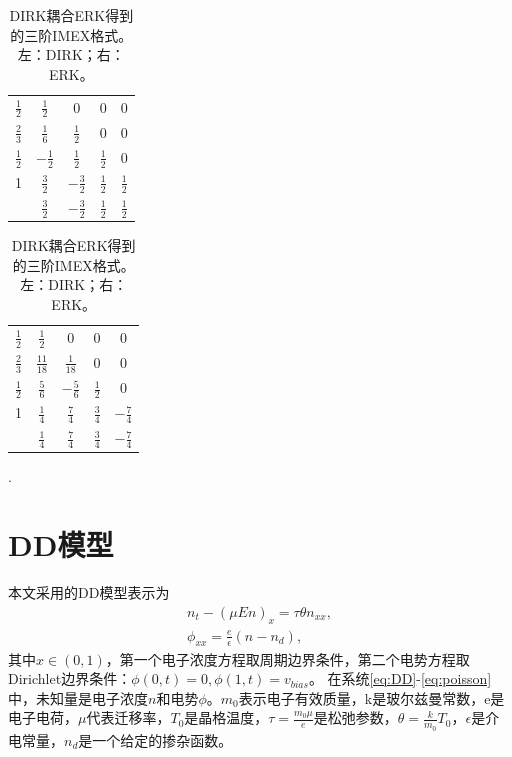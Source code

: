 \begin{table}
    \centering
    \begin{minipage}{0.45\linewidth}
        \centering
        \begin{tabular}{c|cccc}
            $\frac{1}{2}$ & $\frac{1}{2}$  & 0              & 0             & 0             \\
            $\frac{2}{3}$ & $\frac{1}{6}$  & $\frac{1}{2}$  & 0             & 0             \\
            $\frac{1}{2}$ & $-\frac{1}{2}$ & $\frac{1}{2}$  & $\frac{1}{2}$ & 0             \\
            1             & $\frac{3}{2}$  & $-\frac{3}{2}$ & $\frac{1}{2}$ & $\frac{1}{2}$ \\
            \hline
                          & $\frac{3}{2}$  & $-\frac{3}{2}$ & $\frac{1}{2}$ & $\frac{1}{2}$
        \end{tabular}
    \end{minipage}
    \begin{minipage}{0.45\linewidth}
        \centering
        \begin{tabular}{c|cccc}
            $\frac{1}{2}$ & $\frac{1}{2}$   & 0              & 0             & 0              \\
            $\frac{2}{3}$ & $\frac{11}{18}$ & $\frac{1}{18}$ & 0             & 0              \\
            $\frac{1}{2}$ & $\frac{5}{6}$   & $-\frac{5}{6}$ & $\frac{1}{2}$ & 0              \\
            1             & $\frac{1}{4}$   & $\frac{7}{4}$  & $\frac{3}{4}$ & $-\frac{7}{4}$ \\
            \hline
                          & $\frac{1}{4}$   & $\frac{7}{4}$  & $\frac{3}{4}$ & $-\frac{7}{4}$
        \end{tabular}.
    \end{minipage}
    \caption{DIRK耦合ERK得到的三阶IMEX格式。左：DIRK；右：ERK。}
    \label{tab:IMEX:3}
\end{table}

\section{DD模型}

本文采用的DD模型表示为
\begin{align}
    n_t - (\mu En)_x = \tau \theta n_{xx}, \label{eq:DD} \\
    \phi_{xx} = \frac{e}{\epsilon}(n - n_d),  \label{eq:poisson}
\end{align}
其中$x\in(0,1)$，第一个电子浓度方程取周期边界条件，第二个电势方程取Dirichlet边界条件：$\phi(0,t) = 0, \phi(1,t) = v_{bias}$。
在系统\eqref{eq:DD}-\eqref{eq:poisson}中，未知量是电子浓度$n$和电势$\phi$。$m_0$表示电子有效质量，k是玻尔兹曼常数，e是电子电荷，$\mu$代表迁移率，$T_0$是晶格温度，$\tau = \frac{m_0 \mu}{e}$是松弛参数，$\theta = \frac{k}{m_0}T_0$，$\epsilon$是介电常量，$n_d$是一个给定的掺杂函数。


